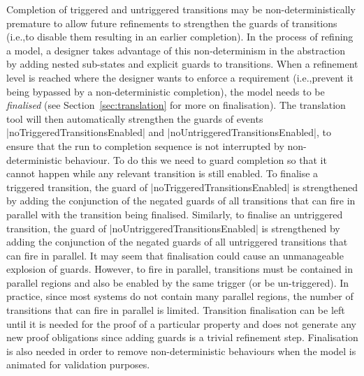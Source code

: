 Completion of triggered and untriggered transitions may be non-deterministically premature to allow future refinements to strengthen the guards of transitions (i.e.,to disable them resulting in an earlier completion).
In the process of refining a model, a designer takes advantage of this non-determinism in the abstraction by adding nested sub-states and explicit guards to transitions. 
When a refinement level is reached where the designer wants to enforce a requirement (i.e.,prevent it being bypassed by a non-deterministic completion), the model needs to be \emph{finalised} (see Section~\ref{sec:translation} for more on finalisation). 
The \SCXML translation tool will then automatically strengthen the guards of events |noTriggeredTransitionsEnabled| and |noUntriggeredTransitionsEnabled|, to ensure that the run to completion sequence is not interrupted by non-deterministic behaviour. 
To do this we need to guard completion so that it cannot happen while any relevant transition is still enabled.
To finalise a triggered transition, the guard of |noTriggeredTransitionsEnabled| is strengthened by adding the conjunction of the negated guards of all transitions that can fire in parallel with the transition being finalised.
Similarly, to finalise an untriggered transition, the guard of |noUntriggeredTransitionsEnabled| is strengthened by adding the conjunction of the negated guards of all untriggered transitions that can fire in parallel.
It may seem that finalisation could cause an unmanageable explosion of guards.
However, to fire in parallel, transitions must be contained in parallel regions and also be enabled by the same trigger (or be un-triggered).
In practice, since most systems do not contain many parallel regions, the number of transitions that can fire in parallel is limited.
Transition finalisation can be left until it is needed for the proof of a particular property and does not generate any new proof obligations since adding guards is a trivial refinement step.
Finalisation is also needed in order to remove non-deterministic behaviours when the model is animated for validation purposes.




